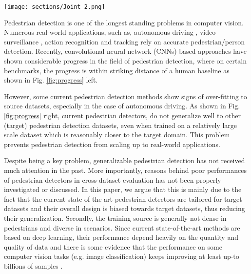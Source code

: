 \documentclass[final]{cvpr}
\newcommand{\caltech}[1]{{Caltech~\cite{dollar2012pedestrian}}}
\newcommand{\cityperson}[1]{{CityPersons~\cite{zhang2017citypersons}}}
\newcommand{\caltecha}[1]{{Caltech}}
\begin{document}
\begin{figure*}[]
	\begin{center}
	    \texttt{[image: sections/Joint\_2.png]}
\end{center}
\caption{Left: 
Pedestrian detection performance over the years for \textit{Caltech}, \textit{CityPersons} and \textit{EuroCityPersons} on the reasonable subset.
\textit{EuroCityPersons} was released in 2018 but we include results of few older models on it as well.
Dotted line marks the human performance on \textit{Caltech}. Right: We show comparison between traditional single-dataset train and test evaluation on \caltech{} \emph{vs.} cross-dataset evaluation for three pedestrian detectors and one general object detector (Cascade R-CNN). Methods enclosed with bounding boxes are trained on \cityperson{} and evaluated on \caltech{}, while others are trained on \caltecha{}. }
\label{fig:progress}
\end{figure*}




Pedestrian detection is one of the longest standing problems in computer vision. Numerous real-world applications, such as, autonomous driving \cite{campmany2016gpu,hbaieb2019pedestrian}, video surveillance \cite{hattori2015learning}, action recognition \cite{zhang2020semantics} and tracking \cite{huang2019bridging} rely on accurate pedestrian/person detection. Recently, convolutional neural network (CNNs) based approaches have shown considerable progress in the field of pedestrian detection, where on certain benchmarks, the progress is within striking distance of a human baseline as shown in Fig. \ref{fig:progress} left. 


However, some current pedestrian detection methods show signs of over-fitting to source datasets, especially in the case of autonomous driving. As shown in Fig. \ref{fig:progress} right, current pedestrian detectors, do not generalize well to other (target) pedestrian detection datasets, even when trained on a relatively large scale dataset which is reasonably closer to the target domain. This problem prevents pedestrian detection from scaling up to real-world applications. 

Despite being a key problem, generalizable pedestrian detection has not received much attention in the past. More importantly, reasons behind poor performances of pedestrian detectors in cross-dataset evaluation has not been properly investigated or discussed. In this paper, we argue that this is mainly due to the fact that the current state-of-the-art pedestrian detectors are tailored for target datasets and their overall design is biased towards target datasets, thus reducing their generalization. Secondly, the training source is generally not dense in pedestrians and diverse in scenarios. Since current state-of-the-art methods are based on deep learning, their performance depend heavily on the quantity and quality of data and there is some evidence that the performance on some computer vision tasks (e.g. image classification) keeps improving at least up-to billions of samples \cite{mahajan2018exploring}.
\end{document}
